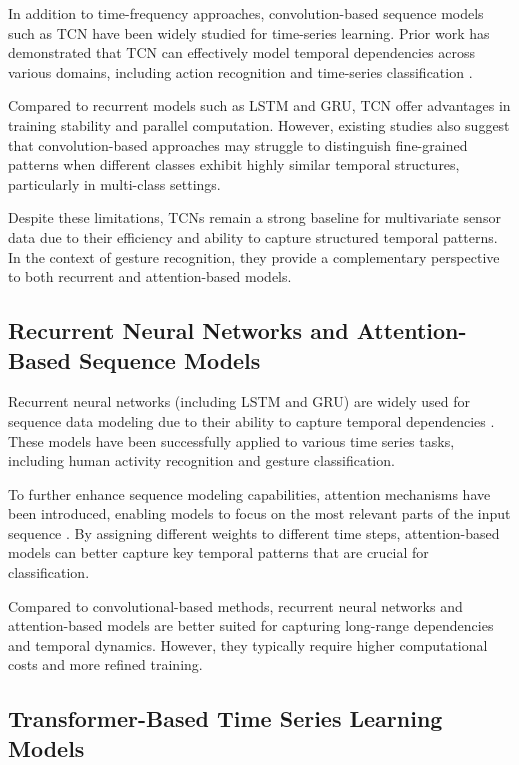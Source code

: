 \documentclass[conference]{IEEEtran}
\begin{document}
In addition to time-frequency approaches, convolution-based sequence models such as TCN have been widely studied for time-series learning. Prior work has demonstrated that TCN can effectively model temporal dependencies across various domains, including action recognition and time-series classification \cite{bai2018empirical, lea2017temporal, wang2017time}.

Compared to recurrent models such as LSTM and GRU, TCN offer advantages in training stability and parallel computation. However, existing studies also suggest that convolution-based approaches may struggle to distinguish fine-grained patterns when different classes exhibit highly similar temporal structures, particularly in multi-class settings.

Despite these limitations, TCNs remain a strong baseline for multivariate sensor data due to their efficiency and ability to capture structured temporal patterns. In the context of gesture recognition, they provide a complementary perspective to both recurrent and attention-based models.

\subsection{Recurrent Neural Networks and Attention-Based Sequence Models}

Recurrent neural networks (including LSTM and GRU) are widely used for sequence data modeling due to their ability to capture temporal dependencies \cite{hochreiter1997lstm}. These models have been successfully applied to various time series tasks, including human activity recognition and gesture classification.

To further enhance sequence modeling capabilities, attention mechanisms have been introduced, enabling models to focus on the most relevant parts of the input sequence \cite{bahdanau2015attention}. By assigning different weights to different time steps, attention-based models can better capture key temporal patterns that are crucial for classification.

Compared to convolutional-based methods, recurrent neural networks and attention-based models are better suited for capturing long-range dependencies and temporal dynamics. However, they typically require higher computational costs and more refined training.

\subsection{Transformer-Based Time Series Learning Models}
\end{document}

